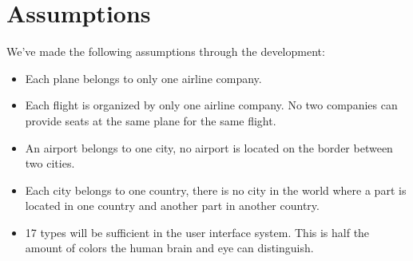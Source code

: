 \section{Assumptions}
We've made the following assumptions through the development:
\begin{itemize}
 \item Each plane belongs to only one airline company.
 \item Each flight is organized by only one airline company. No two companies
can provide seats at the same plane for the same flight.
 \item An airport belongs to one city, no airport is located on the border
between two cities.
 \item Each city belongs to one country, there is no city in the world where a
part is located in one country and another part in another country.
 \item 17 types will be sufficient in the user interface system. This is half
the amount of colors the human brain and eye can distinguish.
\end{itemize}